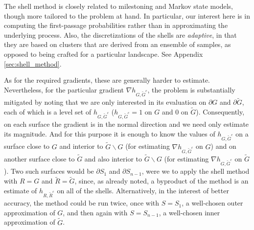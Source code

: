 \documentclass[nofootinbib,english, aip, jcp, priprint, graphicx,floatfix]{revtex4-1}
\theoremstyle{plain}
\theoremstyle{definition}
\theoremstyle{plain}
\begin{document}
The shell method is closely related to milestoning\cite{West2007-cn, Bello-Rivas2015-ld, Aristoff2016-gc} and Markov state models\cite{Pande2010-yi, Chodera2014-bh, Husic2018-xp}, though more tailored to the problem at hand. In particular, our interest here is in computing the first-passage probabilities rather than in approximating the underlying process. Also, the discretizations of the shells are {\em adaptive}, in that they are based on clusters that are derived from an ensemble of samples, as opposed to being crafted for a particular landscape.  See Appendix \ref{sec:shell_method}.
 
As for the required gradients, these are generally harder to estimate. Nevertheless, for the particular gradient $\nabla h_{G, \tilde{G}^c}$, the problem is substantially mitigated by noting that we are only interested in its evaluation on $\partial G$ and $\partial\tilde G$, each of which is a level set of 
$h_{G, \tilde{G}^c}$ ($h_{G, \tilde{G}^c}=1$ on $G$ and 0 on $\tilde G$). Consequently, on each surface the gradient is in the normal direction and we need only estimate its magnitude. And for this purpose it is enough to know the values of $h_{G, \tilde{G}^c}$ on a surface close to $G$ and interior to $\tilde{G}\backslash G$ (for estimating $\nabla h_{G, \tilde{G}^c}$ on $G$) and on another surface  
close to $\tilde{G}$ and also interior to $\tilde{G}\backslash G$ (for estimating $\nabla h_{G, \tilde{G}^c}$ on $\tilde G$). Two such surfaces would be $\partial S_1$ and $\partial S_{n-1}$, were we to apply the shell method with $R=G$ and $\tilde{R}=\tilde{G}$,
since, as already noted, a byproduct of the method is an estimate of 
$h_{R,\tilde{R}^c}$ on all of the shells. Alternatively, in the interest of better accuracy, the method could be run twice, once with $S=S_1$, a well-chosen outer approximation of $G$, and then again with 
$S=S_{n-1}$, a well-chosen inner approximation of $\tilde G$. 

\end{document}
